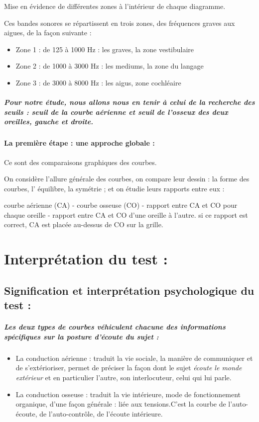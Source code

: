 {Mise en évidence de différentes zones à l\textquoteright intérieur
de chaque diagramme. 

Ces bandes sonores se répartissent en trois zones, des fréquences
graves aux aigues, de la façon suivante :
\begin{itemize}
\item Zone 1 : de 125 à 1000 Hz : les graves, la zone vestibulaire
\item Zone 2 : de 1000 à 3000 Hz : les mediums, la zone du langage
\item Zone 3 : de 3000 à 8000 Hz : les aigus, zone cochléaire
\end{itemize}

\subparagraph*{Pour notre étude, nous allons nous en tenir à celui de la recherche
des seuils : seuil de la courbe aérienne et seuil de l'osseux des
deux oreilles, gauche et droite.}



\paragraph{La première étape : une approche globale : }

Ce sont des comparaisons graphiques des courbes. 

On considère l'allure générale des courbes, on compare leur dessin
: la forme des courbes, l' équilibre, la symétrie ; et on étudie leurs
rapports entre eux : 

courbe aérienne (CA) - courbe osseuse (CO) - rapport entre CA et CO
pour chaque oreille - rapport entre CA et CO d\textquoteright une
oreille à l'autre. si ce rapport est correct, CA est placée au-dessus
de CO sur la grille.
\section{Interprétation du test : }

\subsection{Signification et interprétation psychologique du test : }
\subparagraph{Les deux types de courbes véhiculent chacune des informations spécifiques
sur la posture d'écoute du sujet : }
\begin{itemize}
\item La conduction aérienne : traduit la vie sociale, la manière de communiquer
et de s'extérioriser, permet de préciser la façon dont le sujet\emph{
écoute le monde extérieur} et en particulier l\textquoteright autre,
son interlocuteur, celui qui lui parle. 
\item La conduction osseuse : traduit la vie intérieure, mode de fonctionnement
organique, d'une façon générale : liée aux tensions.C'est la courbe
de l\textquoteright auto-écoute, de l\textquoteright auto-contrôle,
de l'écoute intérieure.
\end{itemize}

}
